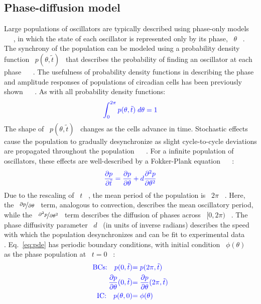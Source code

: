 \documentclass[11pt, letterpaper]{article}
\providecommand{\DIFadd}[1]{{\protect\color{blue}#1}} %
\begin{document}
\subsection*{\DIFadd{Phase-diffusion model}}
\DIFadd{Large populations of oscillators are typically described using phase-only models \mbox{%
\cite{Rougemont2006}
}%
, in which the state of each oscillator is represented only by its phase, \mbox{%
$\theta$
}%
.
The synchrony of the population can be modeled using a probability density function \mbox{%
$p(\theta, \tilde{t})$
}%
that describes the probability of finding an oscillator at each phase \mbox{%
\cite{Kuramoto1984}
}%
.
The usefulness of probability density functions in describing the phase and amplitude responses of populations of circadian cells has been previously shown \mbox{%
\cite{Ukai2007}
}%
.
As with all probability density functions:
}\begin{equation}\DIFadd{
  \int_0^{2\pi} p(\theta, \tilde{t}) \; d\theta = 1
}\end{equation}
\DIFadd{The shape of \mbox{%
$p(\theta, \tilde{t})$
}%
changes as the cells advance in time.
Stochastic effects cause the population to gradually desynchronize as slight cycle-to-cycle deviations are propagated throughout the population \mbox{%
\cite{Teramae2004}
}%
.
For a infinite population of oscillators, these effects are well-described by a Fokker-Plank equation \mbox{%
\cite{Stein1965}
}%
:
}\begin{equation}\DIFadd{
  \frac{\partial p}{\partial \tilde{t}} = \frac{\partial p}{\partial \theta} + d\frac{\partial^2 p}{\partial \theta^2}}\\
  \DIFadd{\label{eq:pde}
}\end{equation}
\DIFadd{Due to the rescaling of \mbox{%
$t$
}%
, the mean period of the population is \mbox{%
$2\pi$
}%
.
Here, the \mbox{%
$\nicefrac{\partial p}{\partial \theta}$
}%
term, analogous to convection, describes the mean oscillatory period, while the \mbox{%
$\nicefrac{\partial^2 p}{\partial \theta^2}$
}%
term describes the diffusion of phases across \mbox{%
$[0, 2\pi)$
}%
.
The phase diffusivity parameter \mbox{%
$d$
}%
(in units of inverse radians) describes the speed with which the population desynchronizes and can be fit to experimental data \mbox{%
\cite{Rougemont2007}
}%
.
Eq.~\ref{eq:pde} has periodic boundary conditions, with initial condition \mbox{%
$\phi(\theta)$
}%
as the phase population at \mbox{%
$t=0$
}%
:
}\begin{align}\DIFadd{
  \text{BCs:}\quad p(0, \tilde{t}) }&\DIFadd{= p(2\pi, \tilde{t}) }\\
  \DIFadd{\frac{\partial p}{\partial \theta}(0, \tilde{t}) }&\DIFadd{= \frac{\partial p}{\partial \theta}(2\pi, \tilde{t}) }\\
  \DIFadd{\text{IC:}\quad p(\theta, 0) }&\DIFadd{= \phi(\theta)\label{eq:pde_ic}
}\end{align}
\end{document}
